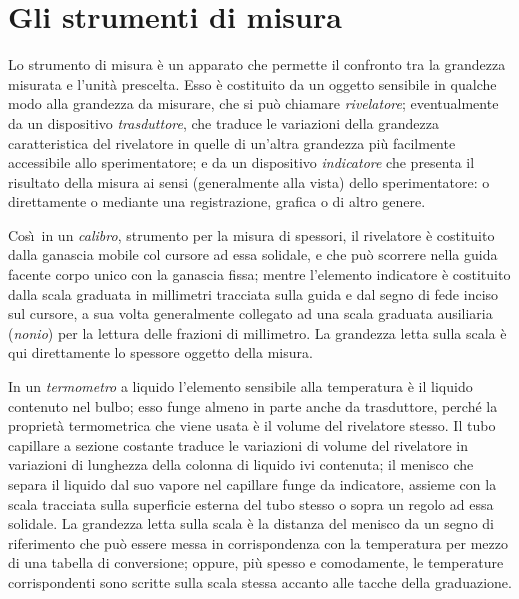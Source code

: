\section{Gli strumenti di misura}%
Lo strumento di misura \`e un apparato che permette il
confronto tra la grandezza misurata e l'unit\`a prescelta.
Esso \`e costituito da un oggetto sensibile in qualche modo
alla grandezza da misurare, che si pu\`o chiamare
\emph{rivelatore}; eventualmente da un dispositivo
\emph{trasduttore}, che traduce le variazioni della
grandezza caratteristica del rivelatore in quelle di
un'altra grandezza pi\`u facilmente accessibile allo
sperimentatore; e da un dispositivo \emph{indicatore} che
presenta il risultato della misura ai sensi (generalmente
alla vista) dello sperimentatore: o direttamente o mediante
una registrazione, grafica o di altro genere.

Cos\`\i\ in un \emph{calibro}, strumento per la misura di
spessori, il rivelatore \`e costituito dalla ganascia mobile
col cursore ad essa solidale, e che pu\`o scorrere nella
guida facente corpo unico con la ganascia fissa; mentre
l'elemento indicatore \`e costituito dalla scala graduata in
millimetri tracciata sulla guida e dal segno di fede inciso
sul cursore, a sua volta generalmente collegato ad una scala
graduata ausiliaria (\emph{nonio}) per la lettura delle
frazioni di millimetro.  La grandezza letta sulla scala \`e
qui direttamente lo spessore oggetto della misura.

In un \emph{termometro} a liquido l'elemento sensibile alla
temperatura \`e il liquido contenuto nel bulbo; esso funge
almeno in parte anche da trasduttore, perch\'e la
propriet\`a termometrica che viene usata \`e il volume del
rivelatore stesso.  Il tubo capillare a sezione costante
traduce le variazioni di volume del rivelatore in variazioni
di lunghezza della colonna di liquido ivi contenuta; il
menisco che separa il liquido dal suo vapore nel capillare
funge da indicatore, assieme con la scala tracciata sulla
superficie esterna del tubo stesso o sopra un regolo ad essa
solidale.  La grandezza letta sulla scala \`e la distanza
del menisco da un segno di riferimento che pu\`o essere
messa in corrispondenza con la temperatura per mezzo di una
tabella di conversione; oppure, pi\`u spesso e comodamente,
le temperature corrispondenti sono scritte sulla scala
stessa accanto alle tacche della graduazione.

